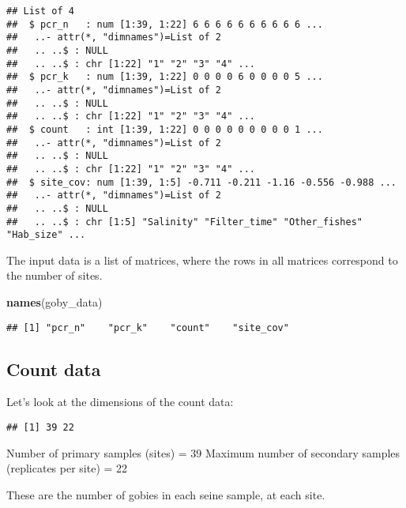 \documentclass[
]{article}
\newenvironment{Shaded}{\begin{snugshade}}{\end{snugshade}}
\newcommand{\FunctionTok}[1]{\textcolor[rgb]{0.13,0.29,0.53}{\textbf{#1}}}
\newcommand{\NormalTok}[1]{#1}
\newcommand{\SpecialCharTok}[1]{\textcolor[rgb]{0.81,0.36,0.00}{\textbf{#1}}}
\begin{document}
\begin{verbatim}
## List of 4
##  $ pcr_n   : num [1:39, 1:22] 6 6 6 6 6 6 6 6 6 6 ...
##   ..- attr(*, "dimnames")=List of 2
##   .. ..$ : NULL
##   .. ..$ : chr [1:22] "1" "2" "3" "4" ...
##  $ pcr_k   : num [1:39, 1:22] 0 0 0 0 6 0 0 0 0 5 ...
##   ..- attr(*, "dimnames")=List of 2
##   .. ..$ : NULL
##   .. ..$ : chr [1:22] "1" "2" "3" "4" ...
##  $ count   : int [1:39, 1:22] 0 0 0 0 0 0 0 0 0 1 ...
##   ..- attr(*, "dimnames")=List of 2
##   .. ..$ : NULL
##   .. ..$ : chr [1:22] "1" "2" "3" "4" ...
##  $ site_cov: num [1:39, 1:5] -0.711 -0.211 -1.16 -0.556 -0.988 ...
##   ..- attr(*, "dimnames")=List of 2
##   .. ..$ : NULL
##   .. ..$ : chr [1:5] "Salinity" "Filter_time" "Other_fishes" "Hab_size" ...
\end{verbatim}

The input data is a list of matrices, where the rows in all matrices
correspond to the number of sites.

\begin{Shaded}
\begin{Highlighting}[]
\FunctionTok{names}\NormalTok{(goby\_data)}
\end{Highlighting}
\end{Shaded}

\begin{verbatim}
## [1] "pcr_n"    "pcr_k"    "count"    "site_cov"
\end{verbatim}

\subsection{Count data}\label{count-data}

Let's look at the dimensions of the count data:

\begin{Shaded}
\end{Shaded}

\begin{verbatim}
## [1] 39 22
\end{verbatim}

Number of primary samples (sites) = 39 Maximum number of secondary
samples (replicates per site) = 22

These are the number of gobies in each seine sample, at each site.
\end{document}

